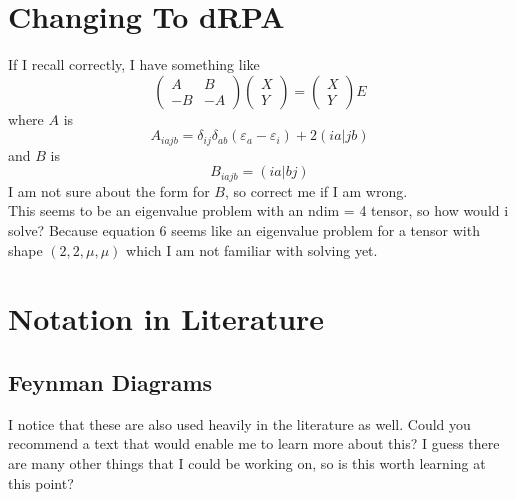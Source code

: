 \documentclass[12pt]{article}
\begin{document}
\section{Changing To dRPA}
If I recall correctly, I have something like
\begin{equation}
    \begin{pmatrix}
    A & B \\
    -B & -A
    \end{pmatrix}
    \begin{pmatrix}
    X \\
    Y
    \end{pmatrix}
    =
    \begin{pmatrix}
    X \\
    Y
    \end{pmatrix}
    E
\end{equation}
where $A$ is 
\begin{equation}
    A_{iajb}=\delta _{ij} \delta _{ab} \left(\varepsilon _{a}-\varepsilon _{i}\right) + 2(ia|jb)
\end{equation}
and $B$ is
\begin{equation}
    B_{iajb} = (ia|bj)
\end{equation}
I am not sure about the form for $B$, so correct me if I am wrong.\\
This seems to be an eigenvalue problem with an ndim = 4 tensor, so how would i solve? Because equation 6 seems like an eigenvalue problem for a tensor with shape $(2, 2, \mu, \mu)$ which I am not familiar with solving yet.



\section{Notation in Literature}
\subsection{Feynman Diagrams}
I notice that these are also used heavily in the literature as well. Could you recommend a text that would enable me to learn more about this? I guess there are many other things that I could be working on, so is this worth learning at this point?
\end{document}
